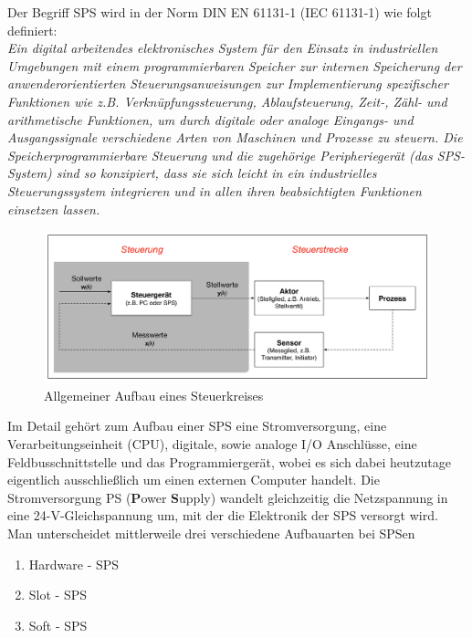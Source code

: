 	Der Begriff SPS wird in der Norm DIN EN 61131-1 (IEC 61131-1) wie folgt definiert:\\
	
	\glqq \textit{Ein digital arbeitendes elektronisches System für den Einsatz in industriellen Umgebungen mit einem programmierbaren Speicher zur internen Speicherung der anwenderorientierten Steuerungsanweisungen zur Implementierung spezifischer Funktionen wie z.B. Verknüpfungssteuerung, Ablaufsteuerung, Zeit-, Zähl- und arithmetische Funktionen, um durch digitale oder analoge Eingangs- und Ausgangssignale verschiedene Arten von Maschinen und Prozesse zu steuern. Die Speicherprogrammierbare Steuerung und die zugehörige Peripheriegerät (das SPS- System) sind so konzipiert, dass sie sich leicht in ein industrielles Steuerungssystem integrieren und in allen ihren beabsichtigten Funktionen einsetzen lassen.}\grqq \space \cite{sps_programmierung}\\
 
 	\begin{figure}[h!]
  		\centering
      	\includegraphics[width=1\textwidth]{graphics/stateoftheart/Aufbau_Steuerkreis_Selfmade.png}
  		\caption{Allgemeiner Aufbau eines Steuerkreises \cite{mseitz_sps}}
			\label{fig:Aufbau_Steuerkreis_Selfmade}
	\end{figure}	
 
 
 Im Detail gehört zum Aufbau einer SPS eine Stromversorgung, eine Verarbeitungseinheit (CPU), digitale, sowie analoge I/O Anschlüsse, eine Feldbusschnittstelle und das Programmiergerät, wobei es sich dabei heutzutage eigentlich ausschließlich um einen externen Computer handelt. Die Stromversorgung PS (\textbf{P}ower \textbf{S}upply) wandelt gleichzeitig die Netzspannung in eine 24-V-Gleichspannung um, mit der die Elektronik der SPS versorgt wird.\\
	
	Man unterscheidet mittlerweile drei verschiedene Aufbauarten bei SPSen
	
	\begin{enumerate}
  		\item Hardware - SPS
  		\item Slot - SPS
  		\item Soft - SPS
	\end{enumerate}

